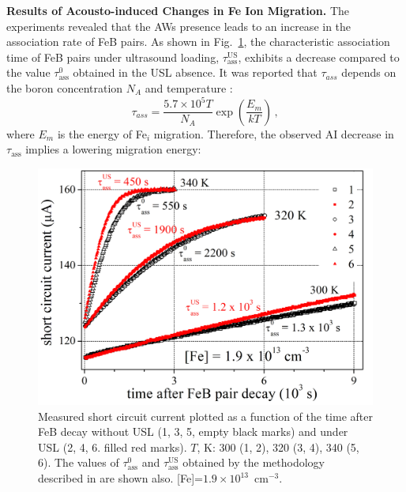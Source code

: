\documentclass{ttp}
\begin{document}
\noindent \textbf{Results of Acousto-induced Changes in Fe Ion Migration.}
The experiments revealed that the AWs presence leads to an increase in the association rate of FeB pairs.
As shown in Fig.~\ref{fig1}, the characteristic association time of FeB pairs
under ultrasound loading, $\tau_\mathrm{ass}^\mathrm{US}$,
exhibits a decrease compared to the value $\tau_\mathrm{ass}^0$ obtained in the USL absence.
It was reported that $\tau_{ass}$ depends on the boron concentration $N_A$
and temperature \cite{FeBAssJAP2014}:
\begin{equation}
\label{eqTass}
\tau_{ass}=\frac{5.7\times10^5T}{N_A}\exp\left(\frac{E_m}{kT}\right)\,,
\end{equation}
where
$E_m$ is the energy of Fe$_i$ migration.
Therefore, the observed AI decrease in $\tau_\mathrm{ass}$ implies a lowering migration energy:


\begin{figure}
	\centering
     \includegraphics[width=\linewidth]{Fig1.png}
	  \caption{Measured short circuit current plotted as a function of the time after FeB decay
      without USL (1, 3, 5, empty black marks) and under USL (2, 4, 6. filled red marks).
      $T$, K: 300 (1, 2), 320 (3, 4), 340 (5, 6).
      The values of $\tau_\mathrm{ass}^0$ and $\tau_\mathrm{ass}^\mathrm{US}$ obtained
      by the methodology described in \cite{Olikh2021JAP,Olikh2022:JMatSci} are shown also.
      [Fe]=$1.9\times10^{13}$~cm$^{-3}$.
}\label{fig1}
\end{figure}
\end{document}
